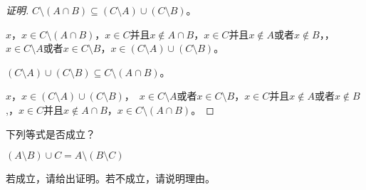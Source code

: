 \documentclass{beamer}
\begin{document}
\begin{CJK*}{UTF8}{gbsn}
\begin{frame}
  \begin{proof}[证明]
    $C\setminus (A\cap B)\subseteq (C\setminus A) \cup (C \setminus B)$。
  
    $x$，$x \in C\setminus (A\cap B)$，$x \in C$并且$x \notin A\cap B$，$x \in C$并且$x\notin A$或者$x\notin B$，，$x\in C\setminus A$或者$x\in C\setminus B$，$x\in (C\setminus A) \cup (C \setminus B)$。
  
    $(C\setminus A) \cup (C \setminus B) \subseteq C\setminus (A\cap B)$。
  
    $x$，$x\in (C\setminus A) \cup (C \setminus B)$，　$x\in C\setminus A$或者$x\in C\setminus B$，$x \in C$并且$x\notin A$或者$x\notin B$,，$x \in C$并且$x \notin A\cap B$，$x \in C\setminus (A\cap B)$。
  \end{proof}
\end{frame}
\begin{frame}
  \begin{Ex}
    下列等式是否成立？
    
      $(A\setminus B)\cup C = A\setminus (B\setminus C)$
    
      若成立，请给出证明。若不成立，请说明理由。
    

\end{Ex}
\end{frame}
\end{CJK*}
\end{document}
